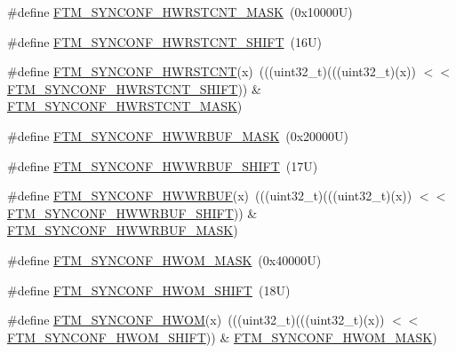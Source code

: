 \begin{DoxyCompactItemize}
\#define \mbox{\hyperlink{group___f_t_m___register___masks_gaea9636cc8049be6d3d952dc343d34185}{F\+T\+M\+\_\+\+S\+Y\+N\+C\+O\+N\+F\+\_\+\+H\+W\+R\+S\+T\+C\+N\+T\+\_\+\+M\+A\+SK}}~(0x10000\+U)
\item 
\#define \mbox{\hyperlink{group___f_t_m___register___masks_gae0f2be27abcc3ae202f10bb3d27a4dc7}{F\+T\+M\+\_\+\+S\+Y\+N\+C\+O\+N\+F\+\_\+\+H\+W\+R\+S\+T\+C\+N\+T\+\_\+\+S\+H\+I\+FT}}~(16\+U)
\item 
\#define \mbox{\hyperlink{group___f_t_m___register___masks_gaae0b2e7326522d8ee5c84b4aea0ec9a1}{F\+T\+M\+\_\+\+S\+Y\+N\+C\+O\+N\+F\+\_\+\+H\+W\+R\+S\+T\+C\+NT}}(x)~(((uint32\+\_\+t)(((uint32\+\_\+t)(x)) $<$$<$ \mbox{\hyperlink{group___f_t_m___register___masks_gae0f2be27abcc3ae202f10bb3d27a4dc7}{F\+T\+M\+\_\+\+S\+Y\+N\+C\+O\+N\+F\+\_\+\+H\+W\+R\+S\+T\+C\+N\+T\+\_\+\+S\+H\+I\+FT}})) \& \mbox{\hyperlink{group___f_t_m___register___masks_gaea9636cc8049be6d3d952dc343d34185}{F\+T\+M\+\_\+\+S\+Y\+N\+C\+O\+N\+F\+\_\+\+H\+W\+R\+S\+T\+C\+N\+T\+\_\+\+M\+A\+SK}})
\item 
\#define \mbox{\hyperlink{group___f_t_m___register___masks_ga6191e61768074435e48f3e3d07076d0f}{F\+T\+M\+\_\+\+S\+Y\+N\+C\+O\+N\+F\+\_\+\+H\+W\+W\+R\+B\+U\+F\+\_\+\+M\+A\+SK}}~(0x20000\+U)
\item 
\#define \mbox{\hyperlink{group___f_t_m___register___masks_gadad6b0aa720155c8c4b689e63a86466a}{F\+T\+M\+\_\+\+S\+Y\+N\+C\+O\+N\+F\+\_\+\+H\+W\+W\+R\+B\+U\+F\+\_\+\+S\+H\+I\+FT}}~(17\+U)
\item 
\#define \mbox{\hyperlink{group___f_t_m___register___masks_gaafb28aa23c9f9aa2cae0c9952c793574}{F\+T\+M\+\_\+\+S\+Y\+N\+C\+O\+N\+F\+\_\+\+H\+W\+W\+R\+B\+UF}}(x)~(((uint32\+\_\+t)(((uint32\+\_\+t)(x)) $<$$<$ \mbox{\hyperlink{group___f_t_m___register___masks_gadad6b0aa720155c8c4b689e63a86466a}{F\+T\+M\+\_\+\+S\+Y\+N\+C\+O\+N\+F\+\_\+\+H\+W\+W\+R\+B\+U\+F\+\_\+\+S\+H\+I\+FT}})) \& \mbox{\hyperlink{group___f_t_m___register___masks_ga6191e61768074435e48f3e3d07076d0f}{F\+T\+M\+\_\+\+S\+Y\+N\+C\+O\+N\+F\+\_\+\+H\+W\+W\+R\+B\+U\+F\+\_\+\+M\+A\+SK}})
\item 
\#define \mbox{\hyperlink{group___f_t_m___register___masks_gac4c190aeac6b3ca490b9a693350c6ec6}{F\+T\+M\+\_\+\+S\+Y\+N\+C\+O\+N\+F\+\_\+\+H\+W\+O\+M\+\_\+\+M\+A\+SK}}~(0x40000\+U)
\item 
\#define \mbox{\hyperlink{group___f_t_m___register___masks_ga64d72753d3b6dee9b83125cfba66b52a}{F\+T\+M\+\_\+\+S\+Y\+N\+C\+O\+N\+F\+\_\+\+H\+W\+O\+M\+\_\+\+S\+H\+I\+FT}}~(18\+U)
\item 
\#define \mbox{\hyperlink{group___f_t_m___register___masks_ga3e6ed12fc2f75d2fe6e37758d2579c0e}{F\+T\+M\+\_\+\+S\+Y\+N\+C\+O\+N\+F\+\_\+\+H\+W\+OM}}(x)~(((uint32\+\_\+t)(((uint32\+\_\+t)(x)) $<$$<$ \mbox{\hyperlink{group___f_t_m___register___masks_ga64d72753d3b6dee9b83125cfba66b52a}{F\+T\+M\+\_\+\+S\+Y\+N\+C\+O\+N\+F\+\_\+\+H\+W\+O\+M\+\_\+\+S\+H\+I\+FT}})) \& \mbox{\hyperlink{group___f_t_m___register___masks_gac4c190aeac6b3ca490b9a693350c6ec6}{F\+T\+M\+\_\+\+S\+Y\+N\+C\+O\+N\+F\+\_\+\+H\+W\+O\+M\+\_\+\+M\+A\+SK}})
$$
\end{DoxyCompactItemize}
